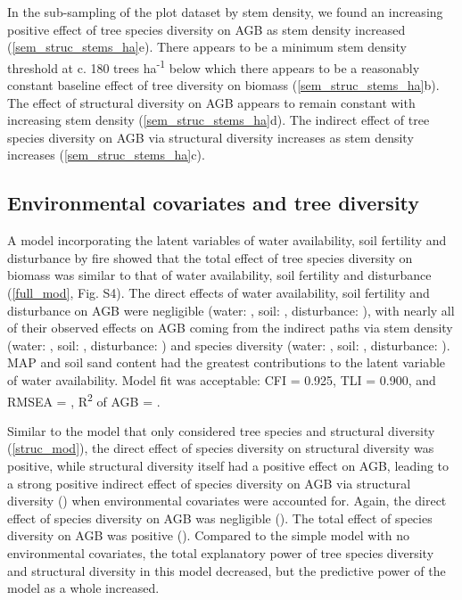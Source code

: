 \documentclass[11pt,a4paper]{article}
\begin{document}
In the sub-sampling of the plot dataset by stem density, we found an increasing positive effect of tree species diversity on AGB as stem density increased (\autoref{sem_struc_stems_ha}e). There appears to be a minimum stem density threshold at c. 180 trees ha\textsuperscript{-1} below which there appears to be a reasonably constant baseline effect of tree diversity on biomass (\autoref{sem_struc_stems_ha}b). The effect of structural diversity on AGB appears to remain constant with increasing stem density (\autoref{sem_struc_stems_ha}d). The indirect effect of tree species diversity on AGB via structural diversity increases as stem density increases (\autoref{sem_struc_stems_ha}c). 


\subsection{Environmental covariates and tree diversity}

A model incorporating the latent variables of water availability, soil fertility and disturbance by fire showed that the total effect of tree species diversity on biomass was similar to that of water availability, soil fertility and disturbance (\autoref{full_mod}, Fig. S4). The direct effects of water availability, soil fertility and disturbance on AGB were negligible (water: \fmbetamb{}, soil: \fmbetasb{}, disturbance: \fmbetafb{}), with nearly all of their observed effects on AGB coming from the indirect paths via stem density (water: \fmbetamib{}, soil: \fmbetasib{}, disturbance: \fmbetafib{}) and species diversity (water: \fmbetamd{}, soil: \fmbetasd{}, disturbance: \fmbetafd{}). MAP and soil sand content had the greatest contributions to the latent variable of water availability. Model fit was acceptable: CFI = 0.925, TLI = 0.900, and RMSEA = \fmrmsea{}, R\textsuperscript{2} of AGB = \fmrsq{}. 

Similar to the model that only considered tree species and structural diversity (\autoref{struc_mod}), the direct effect of species diversity on structural diversity was positive, while structural diversity itself had a positive effect on AGB, leading to a strong positive indirect effect of species diversity on AGB via structural diversity (\fmbetadhb{}) when environmental covariates were accounted for. Again, the direct effect of species diversity on AGB was negligible (\fmbetadb{}). The total effect of species diversity on AGB was positive (\fmbetatotaldb{}). Compared to the simple model with no environmental covariates, the total explanatory power of tree species diversity and structural diversity in this model decreased, but the predictive power of the model as a whole increased.
\end{document}
